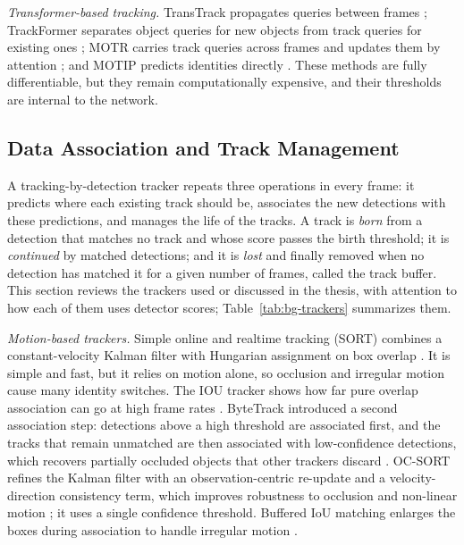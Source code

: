 \emph{Transformer-based tracking.} TransTrack propagates queries between frames \cite{sun2020transtrack}; TrackFormer separates object queries for new objects from track queries for existing ones \cite{meinhardt2022trackformer}; MOTR carries track queries across frames and updates them by attention \cite{zeng2022motr}; and MOTIP predicts identities directly \cite{gao2025motip}. These methods are fully differentiable, but they remain computationally expensive, and their thresholds are internal to the network.

\subsection{Data Association and Track Management}\label{sec:bg-association}
A tracking-by-detection tracker repeats three operations in every frame: it predicts where each existing track should be, associates the new detections with these predictions, and manages the life of the tracks. A track is \emph{born} from a detection that matches no track and whose score passes the birth threshold; it is \emph{continued} by matched detections; and it is \emph{lost} and finally removed when no detection has matched it for a given number of frames, called the track buffer. This section reviews the trackers used or discussed in the thesis, with attention to how each of them uses detector scores; Table~\ref{tab:bg-trackers} summarizes them.

\emph{Motion-based trackers.} Simple online and realtime tracking (SORT) combines a constant-velocity Kalman filter with Hungarian assignment on box overlap \cite{bewley2016sort}. It is simple and fast, but it relies on motion alone, so occlusion and irregular motion cause many identity switches. The IOU tracker shows how far pure overlap association can go at high frame rates \cite{bochinski2017iou}. ByteTrack introduced a second association step: detections above a high threshold are associated first, and the tracks that remain unmatched are then associated with low-confidence detections, which recovers partially occluded objects that other trackers discard \cite{zhang2022bytetrack}. OC-SORT refines the Kalman filter with an observation-centric re-update and a velocity-direction consistency term, which improves robustness to occlusion and non-linear motion \cite{cao2023ocsort}; it uses a single confidence threshold. Buffered IoU matching enlarges the boxes during association to handle irregular motion \cite{yang2023cbiou}.

